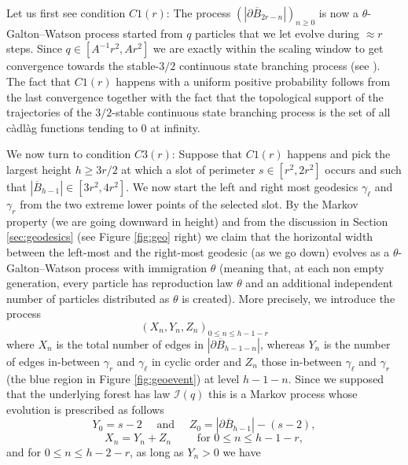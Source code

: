 \documentclass[10pt]{amsart}
\theoremstyle{definition}\newtheorem{defi}[theo]{Definition}\newtheorem{rema}[theo]{Remark}\newtheorem{exam}[theo]{Example}\newtheorem{exem}[theo]{Example}\newtheorem{nota}[theo]{Notation}
\begin{document}
Let us first see condition $C1(r)$: The process $(| \partial \overline{B}_{2r-n}|)_{n \geq 0}$ is now a $\theta$-Galton--Watson process started from $q$ particles that we let evolve during $ \approx r$ steps. Since $ q \in [A^{-1}r^2,Ar^2]$ we are exactly within the scaling window to get convergence towards the stable-$3/2$ continuous state branching process (see \cite{DLG02}). The fact that $C1(r)$ happens with a uniform positive probability follows from the last convergence  together with the fact that the topological support of the trajectories of  the $3/2$-stable continuous state branching process is the set of all c\`adl\`ag functions tending to $0$ at infinity.

We now turn to condition $C3(r)$: Suppose that $C1(r)$ happens and pick the largest height  $h \geq 3r/2$ at which  a slot of perimeter $s \in [r^2,2r^2]$ occurs and such that $|\overline{B}_{h-1}| \in  [3r^{2}, 4r^{2}]$. We now start the left and right most geodesics $\gamma_{ \ell}$ and $\gamma_{r}$ from the two extreme lower points of the selected slot. By the Markov property (we are going downward in height) and from the discussion in Section \ref{sec:geodesics} (see Figure \ref{fig:geo} right) we claim that the horizontal width between the left-most and the right-most geodesic (as we go down) evolves as a $\theta$-Galton--Watson process with immigration $\theta$ {(meaning that, at each non empty generation, every particle has reproduction law $\theta$ and an additional independent number of particles distributed as $\theta$ is created)}. More precisely, we introduce the process $$(X_{n}, Y_{n}, Z_{n})_{0 \leq n \leq h-1-r}$$ where $X_{n}$ is the total number of edges in $| \partial \overline{B}_{h-1-n}|$, whereas $Y_{n}$ is the number of edges in-between $\gamma_{r}$ and $\gamma_{\ell}$ in cyclic order and $Z_{n}$ those in-between $\gamma_{\ell}$ and $\gamma_{r}$ (the blue region in Figure \ref{fig:geoevent}) at level $h-1-n$.  Since we supposed that the underlying forest has law $ \mathcal{I}(q)$ this is a Markov process whose evolution is prescribed as follows
$$ Y_{0} = s-2 \quad \mbox{ and } \quad  Z_{0} = | \partial \overline{B}_{h-1}|-(s-2),$$
$$
X_{n}=Y_{n}+Z_{n} \qquad \mbox{ for } 0 \leq n \leq h-1-r,$$
and for $0 \leq n \leq h-2-r$, as long as $Y_{n}>0$ we have
\end{document}
